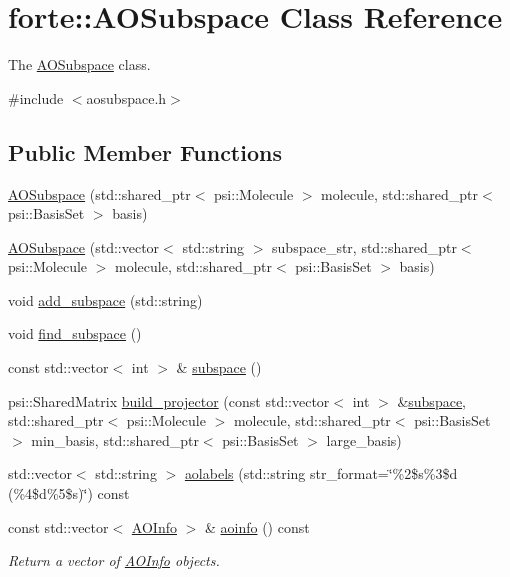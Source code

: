 \hypertarget{classforte_1_1_a_o_subspace}{}\section{forte\+:\+:A\+O\+Subspace Class Reference}
\label{classforte_1_1_a_o_subspace}


The \mbox{\hyperlink{classforte_1_1_a_o_subspace}{A\+O\+Subspace}} class.  




{\ttfamily \#include $<$aosubspace.\+h$>$}

\subsection*{Public Member Functions}
\begin{DoxyCompactItemize}
\item 
\mbox{\hyperlink{classforte_1_1_a_o_subspace_aa7017771aa20fc9e5b8c18df5409dec7}{A\+O\+Subspace}} (std\+::shared\+\_\+ptr$<$ psi\+::\+Molecule $>$ molecule, std\+::shared\+\_\+ptr$<$ psi\+::\+Basis\+Set $>$ basis)
\item 
\mbox{\hyperlink{classforte_1_1_a_o_subspace_a94a2f7faa860318be2fc22cacd073856}{A\+O\+Subspace}} (std\+::vector$<$ std\+::string $>$ subspace\+\_\+str, std\+::shared\+\_\+ptr$<$ psi\+::\+Molecule $>$ molecule, std\+::shared\+\_\+ptr$<$ psi\+::\+Basis\+Set $>$ basis)
\item 
void \mbox{\hyperlink{classforte_1_1_a_o_subspace_aa3be8bc3fec6b8a04b01f5f49fb56aa5}{add\+\_\+subspace}} (std\+::string)
\item 
void \mbox{\hyperlink{classforte_1_1_a_o_subspace_aac4b4260b7081a4d1cdc6be0a96d3491}{find\+\_\+subspace}} ()
\item 
const std\+::vector$<$ int $>$ \& \mbox{\hyperlink{classforte_1_1_a_o_subspace_a25edf43d243fd8d8861b031e8b4bee27}{subspace}} ()
\item 
psi\+::\+Shared\+Matrix \mbox{\hyperlink{classforte_1_1_a_o_subspace_a516076d13d5f32ac3d50fdeffc66bfa9}{build\+\_\+projector}} (const std\+::vector$<$ int $>$ \&\mbox{\hyperlink{classforte_1_1_a_o_subspace_a25edf43d243fd8d8861b031e8b4bee27}{subspace}}, std\+::shared\+\_\+ptr$<$ psi\+::\+Molecule $>$ molecule, std\+::shared\+\_\+ptr$<$ psi\+::\+Basis\+Set $>$ min\+\_\+basis, std\+::shared\+\_\+ptr$<$ psi\+::\+Basis\+Set $>$ large\+\_\+basis)
\item 
std\+::vector$<$ std\+::string $>$ \mbox{\hyperlink{classforte_1_1_a_o_subspace_abe1ed4a268100d4ad84da0d67f1a7f00}{aolabels}} (std\+::string str\+\_\+format=\char`\"{}\%2\$s\%3\$d (\%4\$d\%5\$s)\char`\"{}) const
\item 
const std\+::vector$<$ \mbox{\hyperlink{classforte_1_1_a_o_info}{A\+O\+Info}} $>$ \& \mbox{\hyperlink{classforte_1_1_a_o_subspace_a5dc3be78b487ed49979849d6826b2b04}{aoinfo}} () const
\begin{DoxyCompactList}\small\item\em Return a vector of \mbox{\hyperlink{classforte_1_1_a_o_info}{A\+O\+Info}} objects. \end{DoxyCompactList}\end{DoxyCompactItemize}


